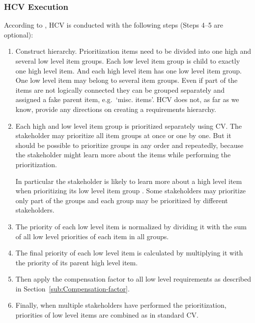 \subsubsection{HCV Execution}
According to \citep{Berander2006a}, HCV is conducted with the following
steps (Steps 4--5 are optional):

\begin{enumerate}
\item Construct hierarchy. Prioritization items need to be divided into
one high and several low level item groups. Each low level item group
is child to exactly one high level item. And each high level item
has one low level item group. One low level item may belong to several
item groups. Even if part of the items are not logically connected they
can be grouped separately and assigned a fake parent item, e.g.\ `misc.
items'. HCV does not, as far as we know, provide any directions on creating a requirements
hierarchy.

\item Each high and low level item group is prioritized separately using
CV. The stakeholder may prioritize all item groups at once or one by one.
But it should be possible to prioritize groups in any order and repeatedly,
because the stakeholder might learn more about the items while performing the prioritization.

In particular the stakeholder is likely to learn more about a high level item when
prioritizing its low level item group \citep{Brenner2009}. Some stakeholders
may prioritize only part of the groups and each group may be prioritized
by different stakeholders.

\item The priority of each low level item is normalized by dividing it with
the sum of all low level priorities of each item in all groups.


\item The final priority of each low level item is calculated by multiplying
it with the priority of its parent high level item.

\item Then apply the compensation factor to all low level requirements as described
in Section~\ref{sub:Compensation-factor}.

\item Finally, when multiple stakeholders have performed the prioritization, priorities
of low level items are combined as in standard CV.
\end{enumerate}

